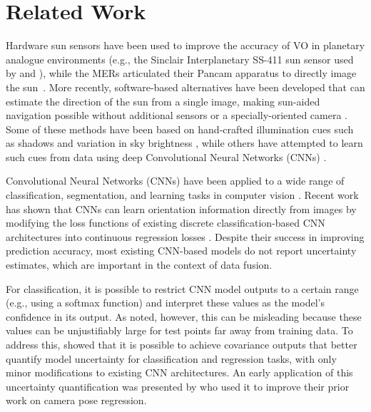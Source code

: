 \section{Related Work}


Hardware sun sensors have been used to improve the accuracy of VO in planetary analogue environments (e.g., the Sinclair Interplanetary SS-411 sun sensor used by \citet{Furgale2011-zu} and \citet{Lambert2012-sn}), while the MERs articulated their Pancam apparatus to directly image the sun~\citep{Maimone2007-tc,Eisenman2002-cg}. 
More recently, software-based alternatives have been developed that can estimate the direction of the sun from a single image, making sun-aided navigation possible without additional sensors or a specially-oriented camera \citep{2017_Clement_Improving}. 
Some of these methods have been based on hand-crafted illumination cues such as shadows and variation in sky brightness \citep{Lalonde2011-jw,2017_Clement_Improving}, while others have attempted to learn such cues from data using deep Convolutional Neural Networks (CNNs) \citep{Ma2016-at}.

Convolutional Neural Networks (CNNs) have been applied to a wide range of classification, segmentation, and learning tasks in computer vision \citep{LeCun2015-qf}. 
Recent work has shown that CNNs can learn orientation information directly from images by modifying the loss functions of existing discrete classification-based CNN architectures into continuous regression losses \citep{Ma2016-at, Kendall2015-ew, Kendall2016-zf}. 
Despite their success in improving prediction accuracy, most existing CNN-based models do not report uncertainty estimates, which are important in the context of data fusion.

For classification, it is possible to restrict CNN model outputs to a certain range (e.g., using a softmax function) and interpret these values as the model's confidence in its output. As \citet{Gal2016UncertaintyThesis} noted, however, this can be misleading because these  values can be unjustifiably large for test points far away from training data.  To address this, \citet{Gal2016-ny} showed that it is possible to achieve covariance outputs that better quantify model uncertainty for classification and regression tasks, with only minor modifications to existing CNN architectures. 
An early application of this uncertainty quantification was presented by \citet{Kendall2016-zf} who used it to improve their prior work \citep{Kendall2015-ew} on camera pose regression.

